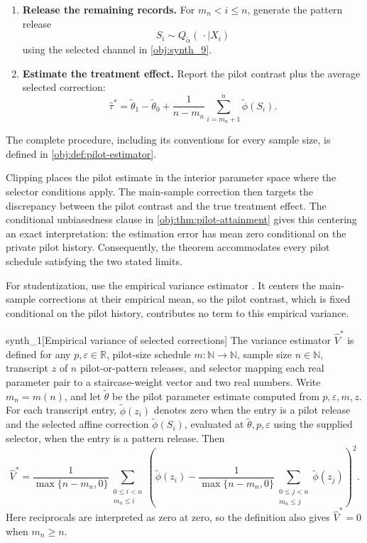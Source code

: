 \begin{center}
{\begin{minipage}{0.94\linewidth}
\begin{enumerate}
\item \textbf{Release the remaining records.}
For \(m_n<i\le n\), generate the pattern release
\[
S_i\sim Q_{\widetilde\alpha}(\,\cdot\mid X_i)
\]
using the selected channel in \cref{obj:synth_9}.

\item \textbf{Estimate the treatment effect.}
Report the pilot contrast plus the average selected correction:
\[
\widehat\tau^*
=\widetilde\theta_1-\widetilde\theta_0
+\frac{1}{n-m_n}\sum_{i=m_n+1}^{n}\widetilde\phi(S_i).
\]
\end{enumerate}
The complete procedure, including its conventions for every sample size, is defined in \cref{obj:def:pilot-estimator}.
\end{minipage}%
}
\end{center}

Clipping places the pilot estimate in the interior parameter space where the selector conditions apply. The main-sample correction then targets the discrepancy between the pilot contrast and the true treatment effect. The conditional unbiasedness clause in \cref{obj:thm:pilot-attainment} gives this centering an exact interpretation: the estimation error has mean zero conditional on the private pilot history. Consequently, the theorem accommodates every pilot schedule satisfying the two stated limits.

For studentization, use the empirical variance estimator . It centers the main-sample corrections at their empirical mean, so the pilot contrast, which is fixed conditional on the pilot history, contributes no term to this empirical variance.

\begin{definitionv}{synth_1}[Empirical variance of selected corrections]
The variance estimator \(\widehat V^*\) is defined for any \(p,\varepsilon\in\mathbb R\), pilot-size schedule \(m:\mathbb N\to\mathbb N\), sample size \(n\in\mathbb N\), transcript \(z\) of \(n\) pilot-or-pattern releases, and selector mapping each real parameter pair to a staircase-weight vector and two real numbers. Write \(m_n=m(n)\), and let \(\widetilde\theta\) be the pilot parameter estimate computed from \(p,\varepsilon,m,z\). For each transcript entry, \(\widetilde\phi(z_i)\) denotes zero when the entry is a pilot release and the selected affine correction \(\widetilde\phi(S_i)\), evaluated at \(\widetilde\theta,p,\varepsilon\) using the supplied selector, when the entry is a pattern release. Then
\[
\widehat V^*
=
\frac{1}{\max\{n-m_n,0\}}
\sum_{\substack{0\le i<n\\m_n\le i}}
\left(
\widetilde\phi(z_i)
-
\frac{1}{\max\{n-m_n,0\}}
\sum_{\substack{0\le j<n\\m_n\le j}}
\widetilde\phi(z_j)
\right)^2.
\]
Here reciprocals are interpreted as zero at zero, so the definition also gives \(\widehat V^*=0\) when \(m_n\ge n\).
\end{definitionv}

